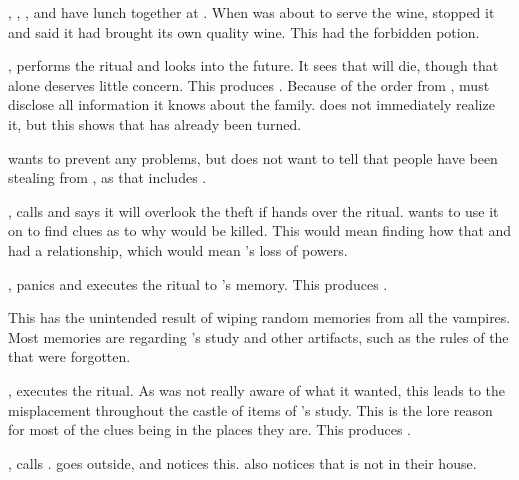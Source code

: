 , , , and  have lunch together at . When  was about to serve the wine,  stopped it and said it had brought its own quality wine. This had the forbidden potion. 

,  performs the ritual and looks into the future. It sees that  will die, though that alone deserves little concern. This produces . Because of the order from ,  must disclose all information it knows about the family.  does not immediately realize it, but this shows that  has already been turned.

 wants to prevent any problems, but does not want to tell  that people have been stealing from , as that includes .

,  calls  and says it will overlook the theft if  hands over the ritual.  wants to use it on  to find clues as to why  would be killed. This would mean  finding how that  and  had a relationship, which would mean 's loss of powers.

,  panics and executes the ritual to 's memory. This produces .

This has the unintended result of wiping random memories from all the vampires. Most memories are regarding 's study and other artifacts, such as the rules of the  that were forgotten.


,  executes the ritual. As  was not really aware of what it wanted, this leads to the misplacement throughout the castle of items of 's study. This is the lore reason for most of the clues being in the places they are. This produces .


,  calls .  goes outside, and  notices this.  also notices that  is not in their house.

